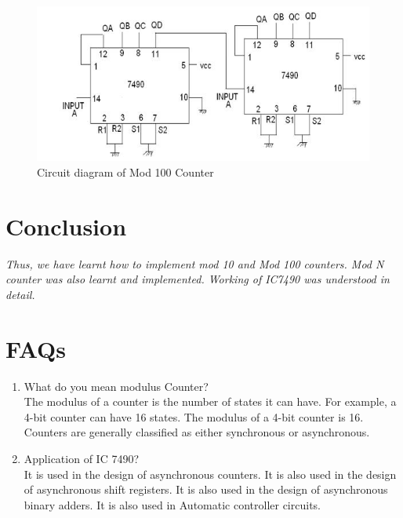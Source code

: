 \documentclass[11pt]{article}
\begin{document}
\begin{figure}[H]
	\centering
	\includegraphics[scale = 0.45]{mod 100.png}
	\caption{Circuit diagram of Mod 100 Counter}
\end{figure}

\section{Conclusion}
\textit{Thus, we have learnt how to implement mod 10 and Mod 100 counters. Mod N counter was also learnt and implemented. Working of IC7490 was understood in detail. }

\pagebreak

\section{FAQs}

\begin{enumerate}
	\item What do you mean modulus Counter?\\
	The modulus of a counter is the number of states it can have. For example, a 4-bit counter can have 16 states. The modulus of a 4-bit counter is 16. Counters are generally classified as either synchronous or asynchronous. 
	\item Application of IC 7490?\\
	It is used in the design of asynchronous counters. It is also used in the design of asynchronous shift registers. It is also used in the design of asynchronous binary adders. It is also used in Automatic controller circuits. 
	
\end{enumerate}
\end{document}
